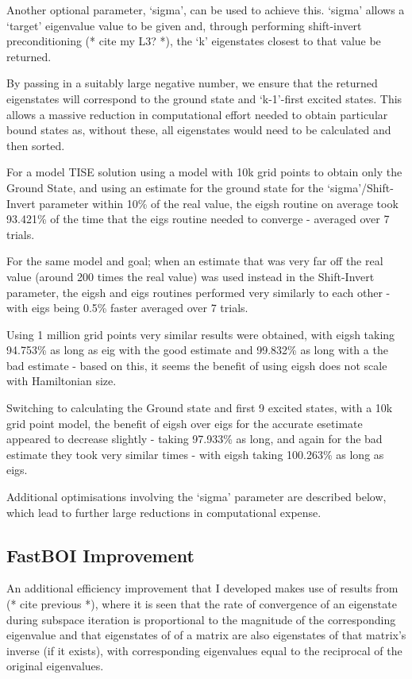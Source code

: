 Another optional parameter, `sigma', can be used to achieve this. `sigma' allows a `target' eigenvalue value to be given and, through performing shift-invert preconditioning (* cite my L3? *), the `k' eigenstates closest to that value be returned. 

By passing in a suitably large negative number, we ensure that the returned eigenstates will correspond to the ground state and `k-1'-first excited states. This allows a massive reduction in computational effort needed to obtain particular bound states as, without these, all eigenstates would need to be calculated and then sorted. 

For a model TISE solution using a model with 10k grid points to obtain only the Ground State, and using an estimate for the ground state for the `sigma'/Shift-Invert parameter within 10\% of the real value, the eigsh routine on average took 93.421\% of the time that the eigs routine needed to converge - averaged over 7 trials. 

For the same model and goal; when an estimate that was very far off the real value (around 200 times the real value) was used instead in the Shift-Invert parameter, the eigsh and eigs routines performed very similarly to each other - with eigs being 0.5\% faster averaged over 7 trials.

Using 1 million grid points very similar results were obtained, with eigsh taking 94.753\% as long as eig with the good estimate and 99.832\% as long with a the bad estimate - based on this, it seems the benefit of using eigsh does not scale with Hamiltonian size.

Switching to calculating the Ground state and first 9 excited states, with a 10k grid point model, the benefit of eigsh over eigs for the accurate esetimate appeared to decrease slightly - taking 97.933\% as long, and again for the bad estimate they took very similar times - with eigsh taking 100.263\% as long as eigs.

Additional optimisations involving the `sigma' parameter are described below, which lead to further large reductions in computational expense.

\subsection{FastBOI Improvement}
An additional efficiency improvement that I developed makes use of results from (* cite previous *), where it is seen that the rate of convergence of an eigenstate during subspace iteration is proportional to the magnitude of the corresponding eigenvalue and that eigenstates of of a matrix are also eigenstates of that matrix's inverse (if it exists), with corresponding eigenvalues equal to the reciprocal of the original eigenvalues. 

